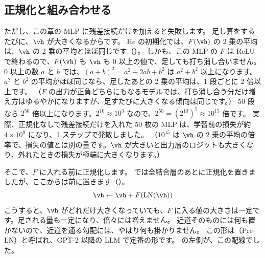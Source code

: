 \subsection*{正規化と組み合わせる}

ただし、この章の MLP に残差接続だけを加えると失敗します。
足し算をするたびに、$\vh$ が大きくなるからです。
He の初期化では、$F(\vh)$ の 2 乗の平均は、$\vh$ の 2 乗の平均とほぼ同じです（）。
しかも、この MLP の $F$ は ReLU で終わるので、$F(\vh)$ も $\vh$ も 0 以上の値で、足しても打ち消し合いません。
0 以上の数 $a$ と $b$ では、$(a+b)^2=a^2+2ab+b^2$ は $a^2+b^2$ 以上になります。
$a^2$ と $b^2$ の平均がほぼ同じなら、足したあとの 2 乗の平均は、1 段ごとに 2 倍以上です。
（$F$ の出力が正負どちらにもなるモデルでは、打ち消し合う分だけ増え方はゆるやかになりますが、足すたびに大きくなる傾向は同じです。）
50 段なら $2^{50}$ 倍以上になります。$2^{10}\approx10^{3}$ なので、$2^{50}=(2^{10})^5\approx10^{15}$ 倍です。
実際、正規化なしで残差接続だけを入れた 50 枚の MLP は、学習前の損失が約 $4\times10^{9}$ になり、1 ステップで発散しました。
（$10^{15}$ は $\vh$ の 2 乗の平均の倍率で、損失の値とは別の量です。$\vh$ が大きいと出力層のロジットも大きくなり、外れたときの損失が極端に大きくなります。）

そこで、$F$ に入れる前に正規化します。
では全結合層のあとに正規化を置きましたが、ここからは前に置きます（）。
\begin{equation}
\vh\leftarrow\vh+F(\mathrm{LN}(\vh))
\label{eq:training-preln}
\end{equation}
こうすると、$\vh$ がどれだけ大きくなっていても、$F$ に入る値の大きさは一定です。足される量も一定になり、倍々には増えません。
近道そのものには何も置かないので、近道を通る勾配には、やはり何も掛かりません。
この形は（Pre-LN）と呼ばれ、GPT-2 以降の LLM で定番の形です\cite{xiong2020layer}。
の左側が、この配線でした。


